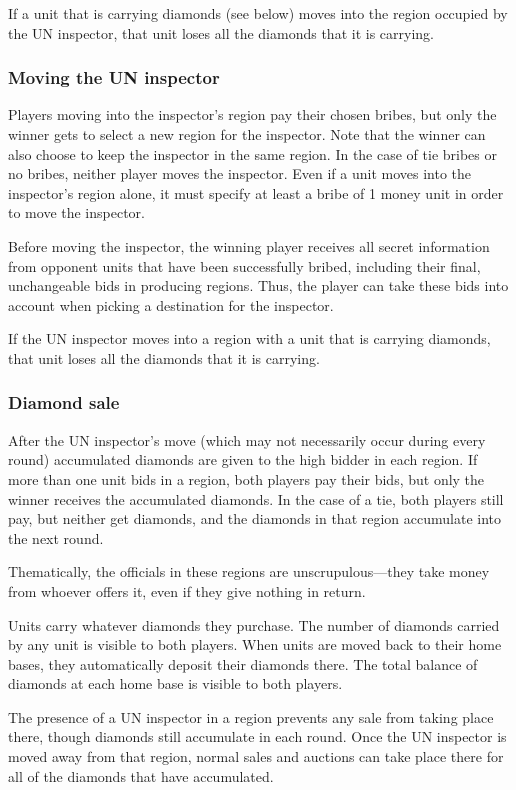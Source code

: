 If a unit that is carrying diamonds (see below) moves into the region occupied by the UN inspector, that unit loses all the diamonds that it is carrying.


\subsubsection{Moving the UN inspector}
Players moving into the inspector's region pay their chosen bribes, but only the winner gets to select a new region for the inspector.  Note that the winner can also choose to keep the inspector in the same region.  In the case of tie bribes or no bribes, neither player moves the inspector.  Even if a unit moves into the inspector's region alone, it must specify at least a bribe of 1 money unit in order to move the inspector.

Before moving the inspector, the winning player receives all secret information from opponent units that have been successfully bribed, including their final, unchangeable bids in producing regions.  Thus, the player can take these bids into account when picking a destination for the inspector.

If the UN inspector moves into a region with a unit that is carrying diamonds, that unit loses all the diamonds that it is carrying.


\subsubsection{Diamond sale}
After the UN inspector's move (which may not necessarily occur during every round) accumulated diamonds are given to the high bidder in each region.  If more than one unit bids in a region, both players pay their bids, but only the winner receives the accumulated diamonds.  In the case of a tie, both players still pay, but neither get diamonds, and the diamonds in that region accumulate into the next round.

Thematically, the officials in these regions are unscrupulous---they take money from whoever offers it, even if they give nothing in return.

Units carry whatever diamonds they purchase.  The number of diamonds carried by any unit is visible to both players.  When units are moved back to their home bases, they automatically deposit their diamonds there.  The total balance of diamonds at each home base is visible to both players.

The presence of a UN inspector in a region prevents any sale from taking place there, though diamonds still accumulate in each round.  Once the UN inspector is moved away from that region, normal sales and auctions can take place there for all of the diamonds that have accumulated.

